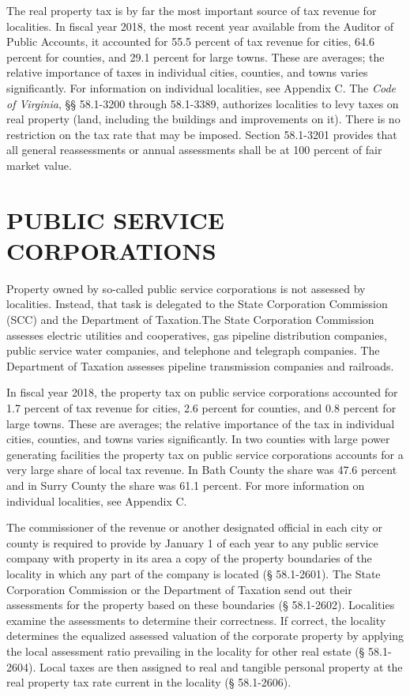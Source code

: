 \documentclass[
]{book}
\begin{document}
The real property tax is by far the most important source of tax revenue for localities. In fiscal year 2018, the most recent year available from the Auditor of Public Accounts, it accounted for 55.5 percent of tax revenue for cities, 64.6 percent for counties, and 29.1 percent for large towns. These are averages; the relative importance of taxes in individual cities, counties, and towns varies significantly. For information on individual localities, see Appendix C.
The \emph{Code of Virginia}, §§ 58.1-3200 through 58.1-3389, authorizes localities to levy taxes on real property (land, including the buildings and improvements on it). There is no restriction on the tax rate that may be imposed. Section 58.1-3201 provides that all general reassessments or annual assessments shall be at 100 percent of fair market value.

\hypertarget{public-service-corporations}{%
\section{PUBLIC SERVICE CORPORATIONS}\label{public-service-corporations}}

Property owned by so-called public service corporations is not assessed by localities. Instead, that task is delegated to the State Corporation Commission (SCC) and the Department of Taxation.The State Corporation Commission assesses electric utilities and cooperatives, gas pipeline distribution companies, public service water companies, and telephone and telegraph companies. The Department of Taxation assesses pipeline transmission companies and railroads.

In fiscal year 2018, the property tax on public service corporations accounted for 1.7 percent of tax revenue for
cities, 2.6 percent for counties, and 0.8 percent for large towns. These are averages; the relative importance of the tax
in individual cities, counties, and towns varies significantly. In two counties with large power generating facilities the
property tax on public service corporations accounts for a very large share of local tax revenue. In Bath County the share was 47.6 percent and in Surry County the share was 61.1 percent. For more information on individual localities, see Appendix C.

The commissioner of the revenue or another designated official in each city or county is required to provide by
January 1 of each year to any public service company with property in its area a copy of the property boundaries of
the locality in which any part of the company is located (§ 58.1-2601). The State Corporation Commission or the
Department of Taxation send out their assessments for the property based on these boundaries (§ 58.1-2602). Localities examine the assessments to determine their correctness. If correct, the locality determines the equalized assessed valuation of the corporate property by applying the local assessment ratio prevailing in the locality for other real estate (§ 58.1-2604). Local taxes are then assigned to real and tangible personal property at the real property tax rate current in the locality (§ 58.1-2606).
\end{document}
